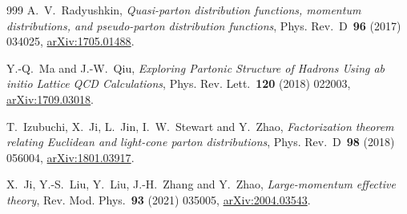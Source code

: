 \begin{thebibliography}{999}
A.~V.~Radyushkin, \emph{Quasi-parton distribution functions, momentum distributions, and pseudo-parton distribution functions}, Phys. Rev.~D~\textbf{96} (2017) \mbox{034025}, \href{https://arxiv.org/abs/1705.01488}{arXiv:1705.01488}.

Y.-Q.~Ma and J.-W.~Qiu, \emph{Exploring Partonic Structure of Hadrons Using \emph{ab initio} Lattice QCD Calculations}, Phys. Rev. Lett.~\textbf{120} (2018) \mbox{022003}, \href{https://arxiv.org/abs/1709.03018}{arXiv:1709.03018}.

T.~Izubuchi, X.~Ji, L.~Jin, I.~W.~Stewart and Y.~Zhao, \emph{Factorization theorem relating Euclidean and light-cone parton distributions}, Phys. Rev.~D~\textbf{98} (2018) \mbox{056004}, \href{https://arxiv.org/abs/1801.03917}{arXiv:1801.03917}.

X.~Ji, Y.-S.~Liu, Y.~Liu, J.-H.~Zhang and Y.~Zhao, \emph{Large-momentum effective theory}, Rev. Mod. Phys.~\textbf{93} (2021) \mbox{035005}, \href{https://arxiv.org/abs/2004.03543}{arXiv:2004.03543}.

\end{thebibliography}

